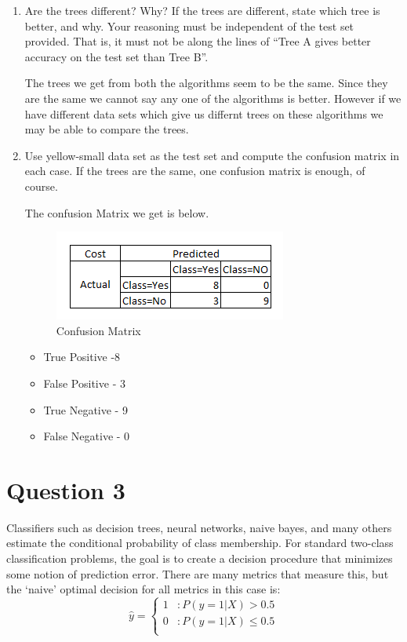 \documentclass[fontsize=10pt]{scrartcl}
\begin{document}
\begin{enumerate}
		\item
		Are the trees different? Why? If the trees are different, state which tree is better, and why. Your reasoning must be independent of the test set provided. That is, it must not be along the lines of ``Tree A gives better accuracy on the test set than Tree B''.

		The trees we get from both the algorithms seem to be the same. Since they are the same we cannot say any one of the algorithms is better. However if we have different data sets which give us differnt trees on these algorithms we may be able to compare the trees.

		\item
		Use yellow-small data set as the test set and compute the confusion matrix in each case. If the trees are the same, one confusion matrix is enough, of course.

		The confusion Matrix we get is below.
		\begin{figure}[H]
			\begin{center}
				\includegraphics[scale=1]{resources/q2_conf.png}
				\caption{Confusion Matrix}
			\end{center}
		\end{figure}

		\begin{itemize}
			\item
			True Positive -8

			\item
			False Positive - 3

			\item
			True Negative - 9

			\item
			False Negative - 0
		\end{itemize}

		\end{enumerate}

	\section{Question 3}
		Classifiers such as decision trees, neural networks, naive bayes, and many others estimate the conditional probability of class membership. For standard two-class classification problems, the goal is to create a decision procedure that minimizes some notion of prediction error. There are many metrics that measure this, but the ‘naive’ optimal decision for all metrics in this case is:\\
		\[ \hat{y} =    \left\{
                  \begin{array}{ll}
                        1 & : P(y=1|X) > 0.5 \\
                        0 & : P(y=1|X) \leq 0.5 \\
                  \end{array} 
                  \right. \]
\end{document}
